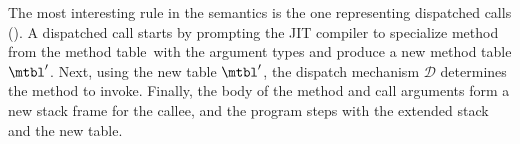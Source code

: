 The most interesting rule in the semantics is the one representing dispatched
calls (). A dispatched call starts by prompting the JIT compiler to
specialize method \m from the method table~\mtbl with the argument types \ol\Ty
and produce a new method table $\mtbl'$. Next, using the new table $\mtbl'$, the
dispatch mechanism $\mathcal D$ determines the method to invoke. Finally, the
body  of the method and call arguments \idx{} form a new
stack frame for the callee, and the program steps with the extended stack and
the new table.


